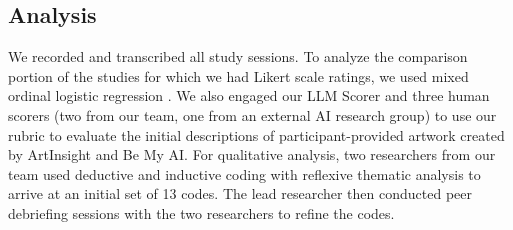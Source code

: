 \documentclass[sigconf]{acmart}
\begin{document}
\subsection{Analysis}
We recorded and transcribed all study sessions. To analyze the comparison portion of the studies for which we had Likert scale ratings, we used mixed ordinal logistic regression \cite{GLMM, OrdinalRegression}. We also engaged our LLM Scorer and three human scorers (two from our team, one from an external AI research group) to use our rubric to evaluate the initial descriptions of participant-provided artwork created by ArtInsight and Be My AI. For qualitative analysis, two researchers from our team used deductive and inductive coding \cite{Braune_And_Clarke} with reflexive thematic analysis \cite{ThematicAnalysisHCI} to arrive at an initial set of 13 codes. The lead researcher then conducted peer debriefing sessions \cite{PeerDebriefing} with the two researchers to refine the codes.

\begin{table*}[h]
\vspace{0.5em}
\caption{Self-reported demographics of BLV family members and children who participated in the first study.}
\label{Participants}
\vspace{-1em}
\end{table*}
\end{document}
